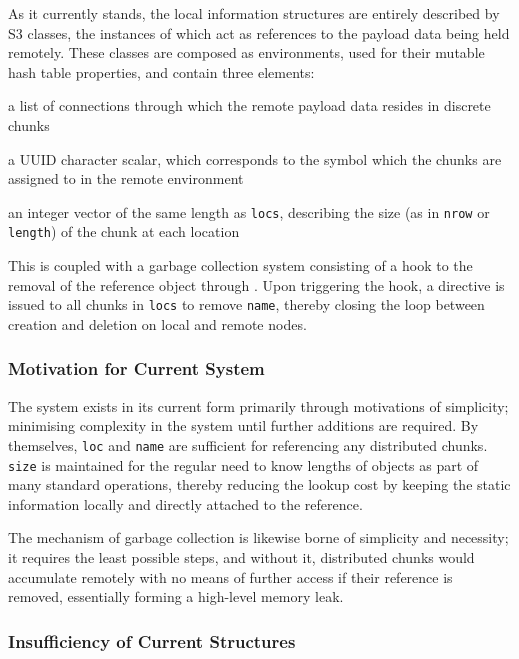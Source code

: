 As it currently stands, the local information structures are entirely
described by S3 classes, the instances of which act as references to the
payload data being held remotely. These classes are composed as
environments, used for their mutable hash table properties, and contain
three elements:

\begin{description}
\tightlist
\item[\texttt{locs}]
a list of  connections through which the remote payload
data resides in discrete chunks
\item[\texttt{name}]
a UUID character scalar, which corresponds to the symbol which the
chunks are assigned to in the remote environment
\item[\texttt{size}]
an integer vector of the same length as \texttt{locs}, describing the
size (as in \texttt{nrow} or \texttt{length}) of the chunk at each
location
\end{description}

This is coupled with a garbage collection system consisting of a hook to
the removal of the reference object through . Upon
triggering the hook, a directive is issued to all chunks in
\texttt{locs} to remove \texttt{name}, thereby closing the loop between
creation and deletion on local and remote nodes.

\subsubsection{Motivation for Current System}\label{motivation-for-current-system}

The system exists in its current form primarily through motivations of
simplicity; minimising complexity in the system until further additions
are required. By themselves, \texttt{loc} and \texttt{name} are
sufficient for referencing any distributed chunks. \texttt{size} is
maintained for the regular need to know lengths of objects as part of
many standard operations, thereby reducing the lookup cost by keeping
the static information locally and directly attached to the reference.

The mechanism of garbage collection is likewise borne of simplicity and
necessity; it requires the least possible steps, and without it,
distributed chunks would accumulate remotely with no means of further
access if their reference is removed, essentially forming a high-level
memory leak.

\subsubsection{Insufficiency of Current Structures}\label{insufficiency-of-current-structures}

